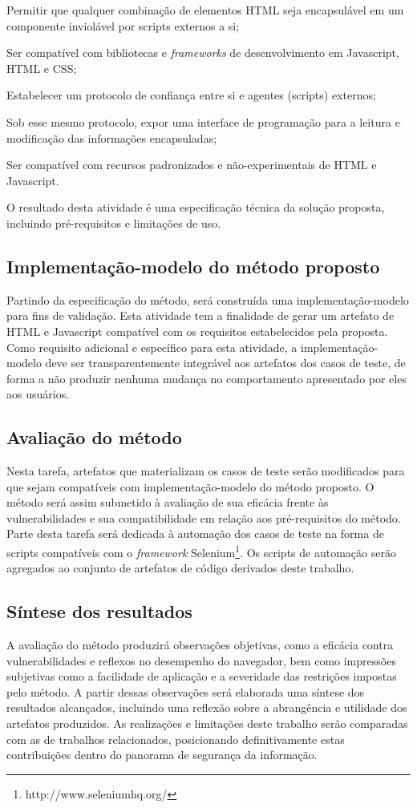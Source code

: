 \begin{alineas}
	\item Permitir que qualquer combinação de elementos HTML seja encapsulável em um componente inviolável por scripts externos a si;
	\item Ser compatível com bibliotecas e \textit{frameworks} de desenvolvimento em Javascript, HTML e CSS;
	\item Estabelecer um protocolo de confiança entre si e agentes (scripts) externos;
	\item Sob esse mesmo protocolo, expor uma interface de programação para a leitura e modificação das informações encapsuladas;
	\item Ser compatível com recursos padronizados e não-experimentais de HTML e Javascript.
\end{alineas}

O resultado desta atividade é uma especificação técnica da solução proposta, incluindo pré-requisitos e limitações de uso.


\subsection{Implementação-modelo do método proposto}
Partindo da especificação do método, será construída uma implementação-modelo para fins de validação. Esta atividade tem a finalidade de gerar um artefato de HTML e Javascript compatível com os requisitos estabelecidos pela proposta. Como requisito adicional e específico para esta atividade, a implementação-modelo deve ser transparentemente integrável aos artefatos dos casos de teste, de forma a não produzir nenhuma mudança no comportamento apresentado por eles aos usuários.


\subsection{Avaliação do método}
Nesta tarefa, artefatos que materializam os casos de teste serão modificados para que sejam compatíveis com implementação-modelo do método proposto. O método será assim submetido à avaliação de sua eficácia frente às vulnerabilidades e sua compatibilidade em relação aos pré-requisitos do método. Parte desta tarefa será dedicada à automação dos casos de teste na forma de scripts compatíveis com o \textit{framework} Selenium\footnote{http://www.seleniumhq.org/}. Os scripts de automação serão agregados ao conjunto de artefatos de código derivados deste trabalho.


\subsection{Síntese dos resultados}
A avaliação do método produzirá observações objetivas, como a eficácia contra vulnerabilidades e reflexos no desempenho do navegador, bem como impressões subjetivas como a facilidade de aplicação e a severidade das restrições impostas pelo método. A partir dessas observações será elaborada uma síntese dos resultados alcançados, incluindo uma reflexão sobre a abrangência e utilidade dos artefatos produzidos. As realizações e limitações deste trabalho serão  comparadas com as de trabalhos relacionados, posicionando definitivamente estas contribuições dentro do panorama de segurança da informação.